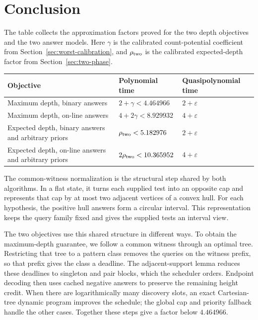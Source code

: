 \section{Conclusion}

The table collects the approximation factors proved for the two depth
objectives and the two answer models. Here $\gamma$ is the calibrated
count-potential coefficient from Section~\ref{sec:worst-calibration},
and $\rho_{\rm two}$ is the calibrated expected-depth factor from
Section~\ref{sec:two-phase}.

\begin{center}
\begin{tabular}{p{}p{}p{}}
\hline
Objective & Polynomial time & Quasipolynomial time\\
\hline
Maximum depth, binary answers &
$2+\gamma<4.464966$ & $2+\varepsilon$\\[3pt]
Maximum depth, on-line answers &
$4+2\gamma<8.929932$ & $4+\varepsilon$\\[3pt]
Expected depth, binary answers and arbitrary priors &
$\rho_{\rm two}<5.182976$ & $2+\varepsilon$\\[3pt]
Expected depth, on-line answers and arbitrary priors &
$2\rho_{\rm two}<10.365952$ & $4+\varepsilon$\\
\hline
\end{tabular}
\end{center}

The common-witness normalization is the structural step shared by
both algorithms. In a flat state, it turns each supplied test into
an opposite cap and represents that cap by at most two adjacent
vertices of a convex hull. For each hypothesis, the positive hull
answers form a circular interval. This representation keeps the
query family fixed and gives the supplied tests an interval view.

The two objectives use this shared structure in different ways. To
obtain the maximum-depth guarantee, we follow a common witness through
an optimal tree. Restricting that tree to a pattern class removes the
queries on the witness prefix, so that prefix gives the class a
deadline. The adjacent-support lemma reduces these deadlines to
singleton and pair blocks, which the scheduler orders. Endpoint
decoding then uses cached negative answers to preserve the remaining
height credit. When there are logarithmically many discovery slots, an
exact Cartesian-tree dynamic program improves the schedule; the global
cap and priority fallback handle the other cases. Together these steps
give a factor below $4.464966$.

